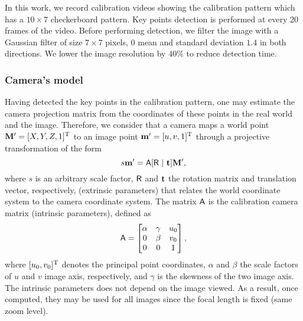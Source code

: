 In this work, we record calibration videos showing the calibration pattern which has a $10\times7$ checkerboard pattern.
Key points detection is performed at every 20 frames of the video.
Before performing detection, we filter the image with a Gaussian filter of size $7\times 7$ pixels, 0 mean and standard deviation $1.4$ in both directions.
We lower the image resolution by $40$\% to reduce detection time.



\subsubsection{Camera's model}\label{sec:cam_model}
%
Having detected the key points in the calibration pattern, one may estimate the camera projection matrix from the coordinates of these points in the real world and the image.
Therefore, we consider that a camera maps a world point $\mathbf{M}' = [X,Y,Z,1]^{\mathrm{T}}$ to an image point $\mathbf{m}' = [u,v,1]^{\mathrm{T}}$ through a projective transformation of the form~\cite{Hartley2004}
\begin{equation}
  \label{eq:projection}
  s\mathbf{m}' = \mathsf{A}[\mathsf{R}~|~\mathbf{t}]\mathbf{M}',
\end{equation}
%
where $s$ is an arbitrary scale factor,
$\mathsf{R}$ and $\mathbf{t}$ the rotation matrix and translation vector, respectively, (extrinsic parameters) that relates the world coordinate system to the camera coordinate system.
The matrix $\mathsf{A}$ is the calibration camera matrix (intrinsic parameters), defined as
%
\begin{equation}
\mathsf{A} =
 \begin{bmatrix}
 \alpha & \gamma & u_0\\
      0 & \beta  & v_0\\
      0 &     0  & 1\\
 \end{bmatrix},
\end{equation}
%
where $[u_0,v_0]^{\mathrm{T}}$ denotes the principal point coordinates,
$\alpha$ and $\beta$ the scale factors of $u$ and $v$ image axis, respectively, and
$\gamma$ is the skewness of the two image axis.
The intrinsic parameters does not depend on the image viewed.
As a result, once computed, they may be used for all images since the focal length is fixed (same zoom level).

